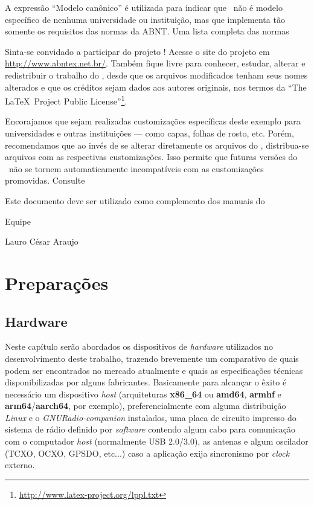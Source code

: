 \documentclass[
  12pt,				%
  openright,			%
  twoside,			%
  a4paper,			%
  english,			%
  french,				%
  spanish,			%
  brazil,				%
  ]{abntex2}
\begin{document}
A expressão ``Modelo canônico'' é utilizada para indicar que \abnTeX\ não é
modelo específico de nenhuma universidade ou instituição, mas que implementa tão
somente os requisitos das normas da ABNT. Uma lista completa das normas

Sinta-se convidado a participar do projeto \abnTeX! Acesse o site do projeto em
\url{http://www.abntex.net.br/}. Também fique livre para conhecer,
estudar, alterar e redistribuir o trabalho do \abnTeX, desde que os arquivos
modificados tenham seus nomes alterados e que os créditos sejam dados aos
autores originais, nos termos da ``The \LaTeX\ Project Public
License''\footnote{\url{http://www.latex-project.org/lppl.txt}}.

Encorajamos que sejam realizadas customizações específicas deste exemplo para
universidades e outras instituições --- como capas, folhas de rosto, etc.
Porém, recomendamos que ao invés de se alterar diretamente os arquivos do
\abnTeX, distribua-se arquivos com as respectivas customizações.
Isso permite que futuras versões do \abnTeX~não se tornem automaticamente
incompatíveis com as customizações promovidas. Consulte

Este documento deve ser utilizado como complemento dos manuais do \abnTeX\

Equipe \abnTeX

Lauro César Araujo


\part{Preparações}

\chapter{Hardware}

Neste capítulo serão abordados os dispositivos de \textit{hardware} utilizados no desenvolvimento deste trabalho, trazendo brevemente um comparativo de quais
podem ser encontrados no mercado atualmente e quais as especificações técnicas disponibilizadas por alguns fabricantes. Basicamente para alcançar o êxito
é necessário um dispositivo \textit{host} (arquiteturas \textbf{x86\_64} ou \textbf{amd64}, \textbf{armhf} e \textbf{arm64}/\textbf{aarch64}, por exemplo),
preferencialmente com alguma distribuição \textit{Linux} e o \textit{GNURadio-companion} instalados, uma placa de circuito impresso do sistema de rádio
definido por \textit{software} contendo algum cabo para comunicação com o computador \textit{host} (normalmente USB 2.0/3.0), as antenas e algum oscilador (TCXO, OCXO, GPSDO, etc...)
caso a aplicação exija sincronismo por \textit{clock} externo.
\end{document}
